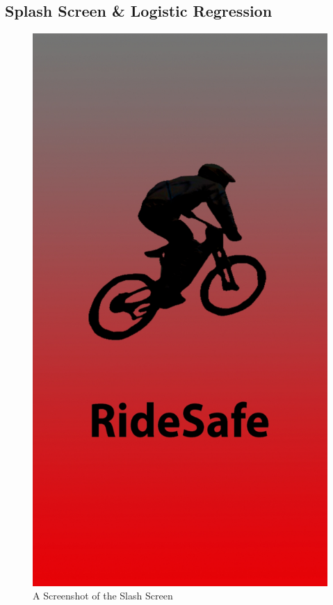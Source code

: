 \subsection{Splash Screen \& Logistic Regression}

\begin{figure}
\begin{center}
\includegraphics[scale = 0.1] {implementation/splash.jpg}
\end{center}
\caption{A Screenshot of the Slash Screen}
\label{splash}
\end{figure}


